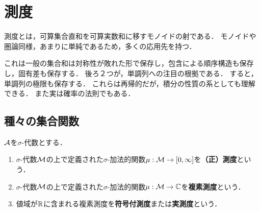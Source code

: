 \documentclass[uplatex, dvipdfmx]{jsreport}
\begin{document}
\section{測度}

\begin{tcolorbox}[colframe=ForestGreen, colback=ForestGreen!10!white,breakable,colbacktitle=ForestGreen!40!white,coltitle=black,fonttitle=\bfseries\sffamily,
title=測度の公理はただ１つ]
    測度とは，可算集合直和を可算実数和に移すモノイドの射である．
    モノイドや圏論同様，あまりに単純であるため，多くの応用先を持つ．

    これは一般の集合和は対称性が敗れた形で保存し，包含による順序構造も保存し，固有差も保存する．
    後ろ２つが，単調列への注目の根拠である．
    すると，単調列の極限も保存する．
    これらは再帰的だが，積分の性質の系としても理解できる．
    また実は確率の法則でもある．
\end{tcolorbox}

\subsection{種々の集合関数}

\begin{tcolorbox}[colframe=ForestGreen, colback=ForestGreen!10!white,breakable,colbacktitle=ForestGreen!40!white,coltitle=black,fonttitle=\bfseries\sffamily,
title=]
    \begin{definition}
        $\mathcal{A}$を$\sigma$-代数とする．
        \begin{enumerate}
            \item $\sigma$-代数$\mathcal{M}$の上で定義された$\sigma$-加法的関数$\mu:\mathcal{M}\to[0,\infty]$を\textbf{（正）測度}という．
            \item $\sigma$-代数$\mathcal{M}$の上で定義された$\sigma$-加法的関数$\mu:\mathcal{M}\to\mathbb{C}$を\textbf{複素測度}という．
            \item 値域が$\mathbb{R}$に含まれる複素測度を\textbf{符号付測度}または\textbf{実測度}という．
        \end{enumerate}
    \end{definition}
\end{tcolorbox}
\end{document}
